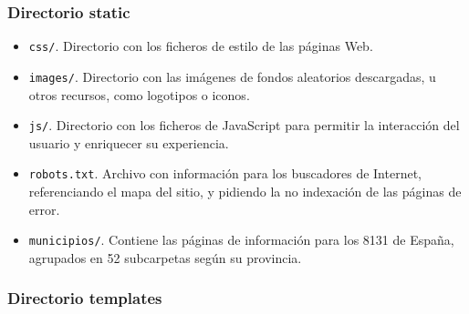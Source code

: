 \subsubsection{Directorio \guillemotleft static\guillemotright\space}

\begin{itemize}
	\item \texttt{css/}. Directorio con los ficheros de estilo de las páginas Web.
	\item \texttt{images/}. Directorio con las imágenes de fondos aleatorios descargadas, u otros recursos, como logotipos o iconos.
	\item \texttt{js/}. Directorio con los ficheros de JavaScript para permitir la interacción del usuario y enriquecer su experiencia.
	\item \texttt{robots.txt}. Archivo con información para los buscadores de Internet, referenciando el mapa del sitio, y pidiendo la no indexación de las páginas de error.
    \item \texttt{municipios/}. Contiene las páginas de información para los 8131 de España, agrupados en 52 subcarpetas según su provincia.

\end{itemize}

\subsubsection{Directorio \guillemotleft templates\guillemotright\space}

